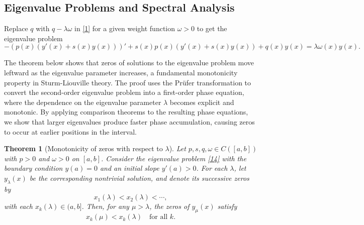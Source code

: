 \documentclass[11pt, reqno]{amsart}
\numberwithin{equation}{section}  %
\theoremstyle{plain}
\newtheorem{theorem}{Theorem}[section]
\theoremstyle{definition}
\theoremstyle{remark}
\begin{document}
\subsection{Eigenvalue Problems and Spectral Analysis}
Replace $q$ with $q - \lambda \omega$ in \eqref{1} for a given weight function $\omega > 0$ to get the eigenvalue problem
\begin{equation} \label{14}
-\left(p(x)\left(y'(x) + s(x)y(x)\right)\right)' + s(x)p(x)\left(y'(x) + s(x)y(x)\right) + q(x)y(x) = \lambda \omega(x)y(x).
\end{equation}

The theorem below shows that zeros of solutions to the eigenvalue problem move leftward as the eigenvalue parameter increases, a fundamental monotonicity property in Sturm-Liouville theory. The proof uses the Pr\"ufer transformation to convert the second-order eigenvalue problem into a first-order phase equation, where the dependence on the eigenvalue parameter $\lambda$ becomes explicit and monotonic. By applying comparison theorems to the resulting phase equations, we show that larger eigenvalues produce faster phase accumulation, causing zeros to occur at earlier positions in the interval.

\begin{theorem}[Monotonicity of zeros with respect to \(\lambda\)]
\label{thm:monotonicity}
Let \( p, s, q, \omega \in C([a,b]) \) with \( p > 0 \) and \( \omega > 0 \) on \( [a,b] \). Consider the eigenvalue problem \eqref{14} with the boundary condition \( y(a) = 0 \) and an initial slope \( y'(a) > 0 \). For each \( \lambda \), let \( y_\lambda(x) \) be the corresponding nontrivial solution, and denote its successive zeros by
\[
x_1(\lambda) < x_2(\lambda) < \cdots,
\]
with each \( x_k(\lambda) \in (a,b] \). Then, for any \( \mu > \lambda \), the zeros of \( y_\mu(x) \) satisfy
\[
x_k(\mu) < x_k(\lambda) \quad \text{for all } k.
\]
\end{theorem}
\end{document}
